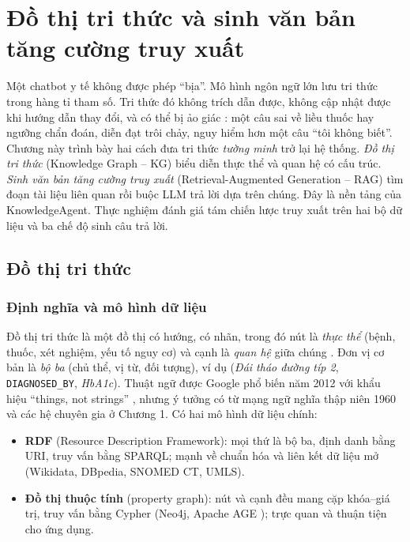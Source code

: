 \chapter{Đồ thị tri thức và sinh văn bản tăng cường truy xuất}
\label{chap:kgrag}

Một chatbot y tế không được phép ``bịa''. Mô hình ngôn ngữ lớn lưu tri thức trong hàng tỉ tham số. Tri thức đó không trích dẫn được, không cập nhật được khi hướng dẫn thay đổi, và có thể bị ảo giác \cite{ji2023halluc}: một câu sai về liều thuốc hay ngưỡng chẩn đoán, diễn đạt trôi chảy, nguy hiểm hơn một câu ``tôi không biết''. Chương này trình bày hai cách đưa tri thức \emph{tường minh} trở lại hệ thống. \emph{Đồ thị tri thức} (Knowledge Graph – KG) biểu diễn thực thể và quan hệ có cấu trúc. \emph{Sinh văn bản tăng cường truy xuất} (Retrieval-Augmented Generation – RAG) tìm đoạn tài liệu liên quan rồi buộc LLM trả lời dựa trên chúng. Đây là nền tảng của KnowledgeAgent. Thực nghiệm đánh giá tám chiến lược truy xuất trên hai bộ dữ liệu và ba chế độ sinh câu trả lời.

\section{Đồ thị tri thức}

\subsection{Định nghĩa và mô hình dữ liệu}

Đồ thị tri thức là một đồ thị có hướng, có nhãn, trong đó nút là \emph{thực thể} (bệnh, thuốc, xét nghiệm, yếu tố nguy cơ) và cạnh là \emph{quan hệ} giữa chúng \cite{hogan2021}. Đơn vị cơ bản là \emph{bộ ba} (chủ thể, vị từ, đối tượng), ví dụ (\emph{Đái tháo đường típ 2}, \texttt{DIAGNOSED\_BY}, \emph{HbA1c}). Thuật ngữ được Google phổ biến năm 2012 với khẩu hiệu ``things, not strings'' \cite{singhal2012}, nhưng ý tưởng có từ mạng ngữ nghĩa thập niên 1960 và các hệ chuyên gia ở Chương 1. Có hai mô hình dữ liệu chính:
\begin{itemize}
  \item \textbf{RDF} (Resource Description Framework): mọi thứ là bộ ba, định danh bằng URI, truy vấn bằng SPARQL; mạnh về chuẩn hóa và liên kết dữ liệu mở (Wikidata, DBpedia, SNOMED CT, UMLS).
  \item \textbf{Đồ thị thuộc tính} (property graph): nút và cạnh đều mang cặp khóa–giá trị, truy vấn bằng Cypher (Neo4j, Apache AGE \cite{apacheage}); trực quan và thuận tiện cho ứng dụng.
\end{itemize}

